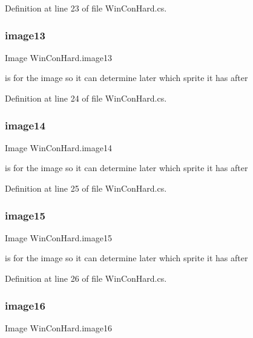 Definition at line 23 of file Win\+Con\+Hard.\+cs.

\mbox{\label{class_win_con_hard_ac9ef6f35df283cfaa0da27cad55204d2}} 
\subsubsection{\texorpdfstring{image13}{image13}}
{\footnotesize\ttfamily Image Win\+Con\+Hard.\+image13}

is for the image so it can determine later which sprite it has after 

Definition at line 24 of file Win\+Con\+Hard.\+cs.

\mbox{\label{class_win_con_hard_a21707563ff3670e03f1c99c74098d177}} 
\subsubsection{\texorpdfstring{image14}{image14}}
{\footnotesize\ttfamily Image Win\+Con\+Hard.\+image14}

is for the image so it can determine later which sprite it has after 

Definition at line 25 of file Win\+Con\+Hard.\+cs.

\mbox{\label{class_win_con_hard_a6eb1b79cd00189b1cf52d064370917aa}} 
\subsubsection{\texorpdfstring{image15}{image15}}
{\footnotesize\ttfamily Image Win\+Con\+Hard.\+image15}

is for the image so it can determine later which sprite it has after 

Definition at line 26 of file Win\+Con\+Hard.\+cs.

\mbox{\label{class_win_con_hard_a08f1f6b90b25f2346f64249069cc46cf}} 
\subsubsection{\texorpdfstring{image16}{image16}}
{\footnotesize\ttfamily Image Win\+Con\+Hard.\+image16}

